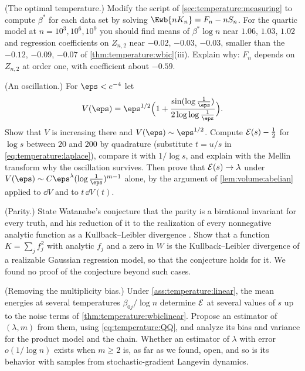 \begin{refsection}
\begin{exercises}
\item \measurement (The optimal temperature.) Modify the script of \cref{sec:temperature:measuring} to compute $\beta^*$ for each data set by solving $\Ewb{nK_n}=F_n-nS_n$. For the quartic model at $n=10^3,10^6,10^9$ you should find means of $\beta^*\log n$ near $1.06$, $1.03$, $1.02$ and regression coefficients on $Z_{n,2}$ near $-0.02$, $-0.03$, $-0.03$, smaller than the $-0.12$, $-0.09$, $-0.07$ of \cref{thm:temperature:wbic}(iii). Explain why: $F_n$ depends on $Z_{n,2}$ at order one, with coefficient about $-0.59$.

\item \measurement (An oscillation.) For $\eps<e^{-4}$ let
\[
V(\eps)=\eps^{1/2}\Bigl(1+\frac{\sin(\log\frac1\eps)}{2\log\log\frac1\eps}\Bigr).
\]
Show that $V$ is increasing there and $V(\eps)\sim\eps^{1/2}$. Compute $\mathcal{E}(s)-\frac12$ for $\log s$ between $20$ and $200$ by quadrature (substitute $t=u/s$ in \eqref{eq:temperature:laplace}), compare it with $1/\log s$, and explain with the Mellin transform why the oscillation survives. Then prove that $\mathcal{E}(s)\to\lambda$ under $V(\eps)\sim C\eps^\lambda(\log\frac1\eps)^{m-1}$ alone, by the argument of \cref{lem:volume:abelian} applied to $\dd V$ and to $t\,\dd V(t)$.\label{ex:temperature:oscillation}

\item \research (Parity.) State Watanabe's conjecture that the parity is a birational invariant for every truth, and his reduction of it to the realization of every nonnegative analytic function as a Kullback--Leibler divergence \parencite[\S3]{Watanabe2013}. Show that a function $K=\sum_jf_j^2$ with analytic $f_j$ and a zero in $W$ is the Kullback--Leibler divergence of a realizable Gaussian regression model, so that the conjecture holds for it. We found no proof of the conjecture beyond such cases.

\item \research (Removing the multiplicity bias.) Under \cref{ass:temperature:linear}, the mean energies at several temperatures $\beta_{0j}/\log n$ determine $\mathcal{E}$ at several values of $s$ up to the noise terms of \cref{thm:temperature:wbiclinear}. Propose an estimator of $(\lambda,m)$ from them, using \eqref{eq:temperature:QQ}, and analyze its bias and variance for the product model and the chain. Whether an estimator of $\lambda$ with error $o(1/\log n)$ exists when $m\ge2$ is, as far as we found, open, and so is its behavior with samples from stochastic-gradient Langevin dynamics.\label{ex:temperature:research}
\end{exercises}


\end{refsection}
